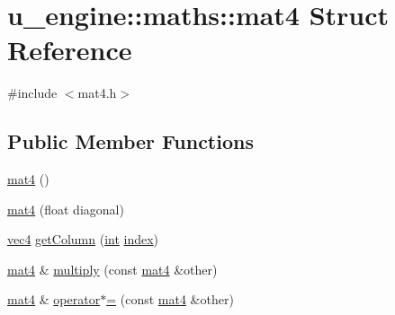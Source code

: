 \hypertarget{structu__engine_1_1maths_1_1mat4}{}\section{u\+\_\+engine\+:\+:maths\+:\+:mat4 Struct Reference}
\label{structu__engine_1_1maths_1_1mat4}


{\ttfamily \#include $<$mat4.\+h$>$}

\subsection*{Public Member Functions}
\begin{DoxyCompactItemize}
\item 
\hyperlink{structu__engine_1_1maths_1_1mat4_a3e30d4dc01f897306d0b9ab969e6a78f}{mat4} ()
\item 
\hyperlink{structu__engine_1_1maths_1_1mat4_aaab4e7ed7809ee1a99ea5ae8b5488ce4}{mat4} (float diagonal)
\item 
\hyperlink{structu__engine_1_1maths_1_1vec4}{vec4} \hyperlink{structu__engine_1_1maths_1_1mat4_a48f5a4fe578dfb584fab942877972a94}{get\+Column} (\hyperlink{wglew_8h_a500a82aecba06f4550f6849b8099ca21}{int} \hyperlink{glew_8h_a57f14e05b1900f16a2da82ade47d0c6d}{index})
\item 
\hyperlink{structu__engine_1_1maths_1_1mat4}{mat4} \& \hyperlink{structu__engine_1_1maths_1_1mat4_a24a049d834f2b5905d22e3cdbd75b10d}{multiply} (const \hyperlink{structu__engine_1_1maths_1_1mat4}{mat4} \&other)
\item 
\hyperlink{structu__engine_1_1maths_1_1mat4}{mat4} \& \hyperlink{structu__engine_1_1maths_1_1mat4_a34f02331c174475d829789d6a89802b2}{operator$\ast$=} (const \hyperlink{structu__engine_1_1maths_1_1mat4}{mat4} \&other)
\end{DoxyCompactItemize}
